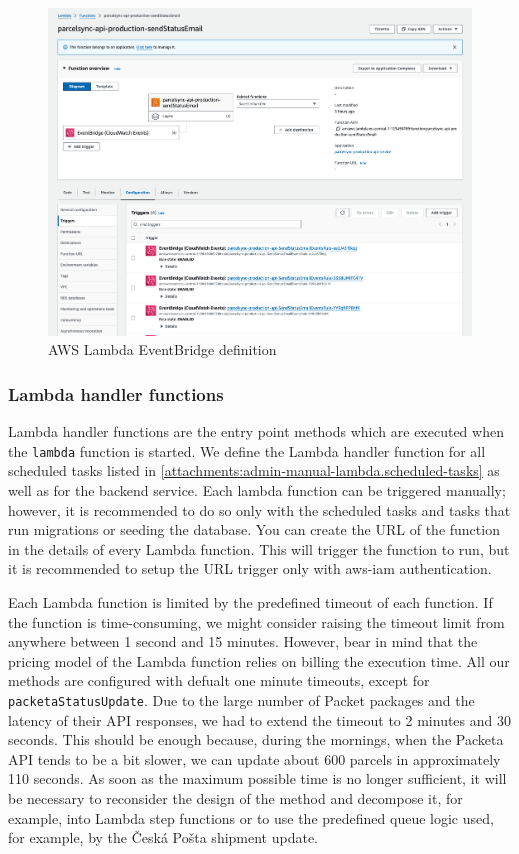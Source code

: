 \begin{figure}[H]\centering
\includegraphics[width=140mm]{img/docs/fig_aws_eventbridge.png}
\caption{AWS Lambda EventBridge definition}
\label{img:admin-manual-aws.lambda.eventbridge}
\end{figure}

\subsubsection{Lambda handler functions}
Lambda handler functions are the entry point methods which are executed when the \texttt{lambda} function is started.
We define the Lambda handler function for all scheduled tasks listed in \ref{attachments:admin-manual-lambda.scheduled-tasks} as well as for the backend service.
Each lambda function can be triggered manually; however, it is recommended to do so only with the scheduled tasks and tasks that run migrations or seeding the database.
You can create the URL of the function in the details of every Lambda function.
This will trigger the function to run, but it is recommended to setup the URL trigger only with \gls{aws-iam} authentication.

Each Lambda function is limited by the predefined timeout of each function.
If the function is time-consuming, we might consider raising the timeout limit from anywhere between 1 second and 15 minutes.
However, bear in mind that the pricing model of the Lambda function relies on billing the execution time.
All our methods are configured with defualt one minute timeouts, except for \texttt{packetaStatusUpdate}.
Due to the large number of Packet packages and the latency of their API responses, we had to extend the timeout to 2 minutes and 30 seconds.
This should be enough because, during the mornings, when the Packeta API tends to be a bit slower, we can update about 600 parcels in approximately 110 seconds.
As soon as the maximum possible time is no longer sufficient, it will be necessary to reconsider the design of the method and decompose it, for example, into Lambda step functions or to use the predefined queue logic used, for example, by the Česká Pošta shipment update.




